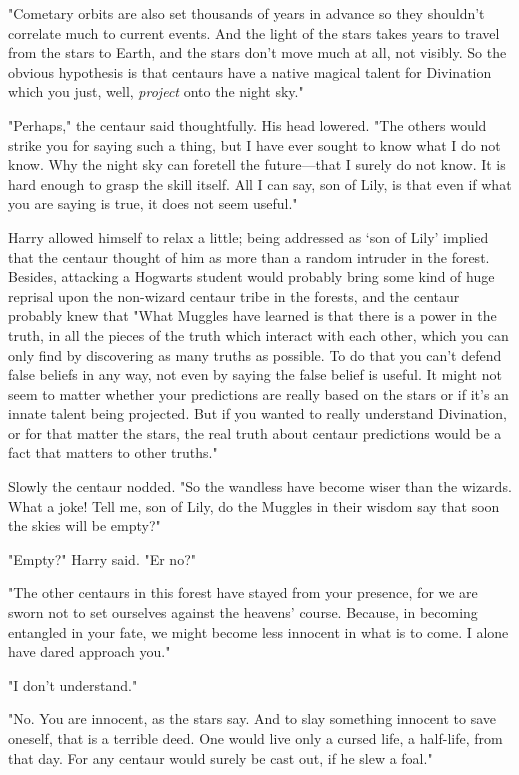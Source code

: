 "Cometary orbits are also set thousands of years in advance so they shouldn't
correlate much to current events. And the light of the stars takes years to
travel from the stars to Earth, and the stars don't move much at all, not
visibly. So the obvious hypothesis is that centaurs have a native magical
talent for Divination which you just, well, \emph{project} onto the night sky."

"Perhaps," the centaur said thoughtfully. His head lowered. "The others would
strike you for saying such a thing, but I have ever sought to know what I do
not know. Why the night sky can foretell the future---that I surely do not
know. It is hard enough to grasp the skill itself. All I can say, son of Lily,
is that even if what you are saying is true, it does not seem useful."

Harry allowed himself to relax a little; being addressed as `son of Lily'
implied that the centaur thought of him as more than a random intruder in the
forest. Besides, attacking a Hogwarts student would probably bring some kind of
huge reprisal upon the non-wizard centaur tribe in the forests, and the centaur
probably knew that{\el} "What Muggles have learned is that there is a power
in the truth, in all the pieces of the truth which interact with each other,
which you can only find by discovering as many truths as possible. To do that
you can't defend false beliefs in any way, not even by saying the false belief
is useful. It might not seem to matter whether your predictions are really
based on the stars or if it's an innate talent being projected. But if you
wanted to really understand Divination, or for that matter the stars, the real
truth about centaur predictions would be a fact that matters to other truths."

Slowly the centaur nodded. "So the wandless have become wiser than the wizards.
What a joke! Tell me, son of Lily, do the Muggles in their wisdom say that soon
the skies will be empty?"

"Empty?" Harry said. "Er{\el} no?"

"The other centaurs in this forest have stayed from your presence, for we are
sworn not to set ourselves against the heavens' course. Because, in becoming
entangled in your fate, we might become less innocent in what is to come. I
alone have dared approach you."

"I{\el} don't understand."

"No. You are innocent, as the stars say. And to slay something innocent to save
oneself, that is a terrible deed. One would live only a cursed life, a
half-life, from that day. For any centaur would surely be cast out, if he slew
a foal."

